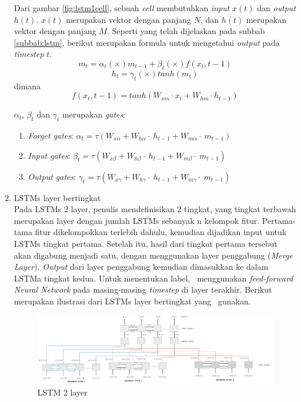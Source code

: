 \begin{enumerate}
	Dari gambar \ref{fig:lstm1cell}, sebuah \textit{cell} membutuhkan \textit{input} $ x(t) $ dan \textit{output} $ h(t) $. $ x(t) $ merupakan vektor dengan panjang $ N $, dan $ h(t) $ merupakan vektor dengan panjang $ M $. Seperti yang telah dijelaskan pada subbab \ref{subbab:lstm}, berikut merupakan formula untuk mengetahui \textit{output} pada \textit{timestep} $ t $.
	\begin{equation}\label{eq:lstmm}
	m_{t}=\alpha_{t} (\times) m_{t-1} + \beta_{t} (\times) f(x_{t},{t-1})
	\end{equation}
	\begin{equation}\label{eq:lstmh}
	h_{t}=\gamma_{t} (\times) tanh(m_{t})
	\end{equation}
	dimana
	\begin{equation}\label{eq:lstmx}
	f(x_{t},{t-1})=tanh(W_{xm} \cdot x_{t} + W_{hm} \cdot h_{t-1})
	\end{equation}
	
	$ \alpha_t $, $ \beta_t $ dan $ \gamma_t $ merupakan \textit{gates}:
	\begin{enumerate}
		\item \textit{Forget gates}: $ \alpha_{t}=\tau(W_{x\alpha}+W_{h\alpha}\cdot~h_{t-1}+W_{m\alpha}\cdot~m_{t-1}) $
		\item \textit{Input gates}: $ \beta_{t}=\tau(W_{x\beta}+W_{h\beta}\cdot~h_{t-1}+W_{m\beta}\cdot~m_{t-1}) $
		\item \textit{Output gates}: $ \gamma_{t}=\tau(W_{x\gamma}+W_{h\gamma}\cdot~h_{t-1}+W_{m\gamma}\cdot~m_{t-1}) $
	\end{enumerate}

	\item LSTMs layer bertingkat\\
	Pada LSTMs 2 layer, penulis mendefinisikan 2 tingkat, yang tingkat terbawah merupakan layer dengan jumlah LSTMs sebanyak n kelompok fitur. Pertama-tama fitur dikelompokkan terlebih dahulu, kemudian dijadikan input untuk LSTMs tingkat pertama. Setelah itu, hasil dari tingkat pertama tersebut akan digabung menjadi satu, dengan menggunakan layer penggabung (\textit{Merge Layer}). \textit{Output} dari layer penggabung kemudian dimasukkan ke dalam LSTMa tingkat kedua. Untuk menentukan label, \saya~menggunakan \textit{feed-forward Neural Network} pada masing-masing \textit{timestep} di layer terakhir. Berikut merupakan ilustrasi dari LSTMs layer bertingkat yang \saya~gunakan.
	
	\begin{figure}
		\centering
		\includegraphics[width=1.0\linewidth]{images/lstm2}
		\caption{LSTM 2 layer}
		\label{fig:lstm2}
	\end{figure}


\end{enumerate}
